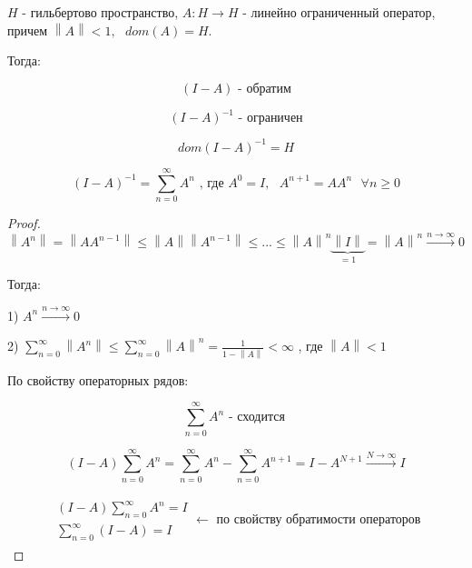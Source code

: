 \documentclass[12pt, a4paper]{report}
\begin{document}
\begin{theorem}
    \( H \) - гильбертово пространство, \( A: H \to  H  \) - линейно ограниченный оператор, причем \( \left\lVert  A  \right\rVert <1 , \text{ }  dom (A ) = H \). 
    
    Тогда:  
    
    \[ (I -A ) \text{ - обратим}  \] 

    \[ (I -A )^{-1}  \text{ - ограничен} \] 

    \[ dom (I - A )^{-1 } = H  \] 

    \[ (I -A )^{-1 }  = \sum_{n =0 } ^{ \infty  } A^{n }  \text{ , где }  A^{0 }  = I , \text{ }  A^{n+1 }  = A A ^{n }  \text{ }  \forall  n \ge 0\]  
\end{theorem}

\begin{proof} \(  \) \\

    \[ \left\lVert A  ^{n} \right\rVert  = \left\lVert A A ^{n-1 }  \right\rVert \le \left\lVert A  \right\rVert \left\lVert A^{n-1 }  \right\rVert \le  ... \le \left\lVert A  \right\rVert^{n } \underbrace{ \left\lVert I  \right\rVert }_{=1}= \left\lVert A  \right\rVert ^{n }  \xrightarrow{n \to  \infty  }0   \] 

    Тогда: 

    1) \( A^ n \xrightarrow{ n \to  \infty  } 0   \) 

    2) \( \displaystyle  \sum_{n =0 }^{ \infty  } \left\lVert  A ^{n }  \right\rVert \le  \sum_{n =0 }^{ \infty  } \left\lVert A  \right\rVert^n = \frac{1}{1 - \left\lVert A  \right\rVert}  < \infty \) 
    , где \( \left\lVert A \right\rVert <1\) 

    По свойству операторных рядов: 

    \[ \sum_{n =0 } ^{ \infty  } A^n \text{ - сходится }   \] 

    \[ (I -A ) \sum_{n =0 }^{ \infty  } A^{ n }  = \sum_{n =0 } ^{ \infty  } A^ n - \sum_{n =0 }^{ \infty  } A^{n +1 }  = I - A^{N +1 } \xrightarrow{ N \to  \infty  } I      \]  

    \[ \begin{aligned}
        \begin{aligned}
            (I -A ) \sum_{n = 0 } ^{\infty  } A^{n }  = I \\
            \sum_{n =0 } ^{ \infty  } (I -A ) = I  
        \end{aligned}
         \xleftarrow{}  
        \text{ по свойству обратимости операторов} 
    \end{aligned}     \]  
    

\end{proof}
\end{document}
